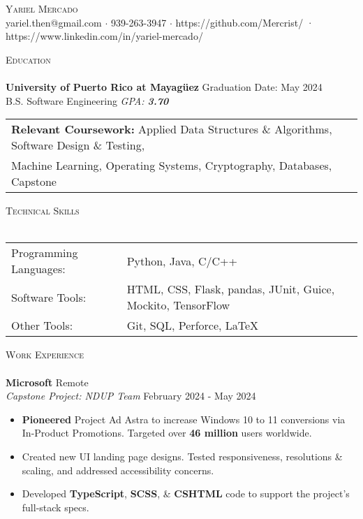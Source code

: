 \documentclass[a4paper]{article}
\newcommand{\lineunder} {
    \vspace*{-8pt} \\
    \hspace*{-18pt} \hrulefill \\
}
\newcommand{\header} [1] {
    {\hspace*{-18pt}\vspace*{6pt} \textsc{#1}}
    \vspace*{-6pt} \lineunder
}
\begin{document}
\vspace*{-40pt}

    

\vspace*{-10pt}
\begin{center}
	{\Huge \scshape {Yariel Mercado}}\\
	yariel.then@gmail.com $\cdot$ 939-263-3947 $\cdot$ https://github.com/Mercrist/ · https://www.linkedin.com/in/yariel-mercado/\\
\end{center}

\header{Education}
\textbf{University of Puerto Rico at Mayagüez} \hfill Graduation Date: May 2024\\	
B.S. Software Engineering \textit{GPA: \bf{3.70}} 

\vspace{2mm}
\begin{tabular}{ l l }
	\textbf{Relevant Coursework:} Applied Data Structures \& Algorithms, Software Design \& Testing, \\Machine Learning, Operating Systems, Cryptography, Databases, Capstone 
\vspace{2mm}
\end{tabular}

\header{Technical Skills}
\begin{tabular}{ l l }
	Programming Languages: & Python, Java, C/C++    \\
	Software Tools: & HTML, CSS, Flask, pandas, JUnit, Guice, Mockito, TensorFlow \\
	Other Tools:   & Git, SQL, Perforce, \LaTeX{} \\
	
\end{tabular}
\vspace{2mm}

\header{Work Experience}
\vspace{-1mm}
\textbf{Microsoft} \hfill Remote\\
\textit{Capstone Project: NDUP Team} \hfill February 2024 - May 2024\\
\vspace{-3mm}
\begin{itemize} \itemsep -1pt
	\item \textbf{Pioneered} Project Ad Astra to increase Windows 10 to 11 conversions via In-Product Promotions. Targeted over \textbf{46 million} users worldwide. 
	\item Created new UI landing page designs. Tested responsiveness, resolutions \& scaling, and addressed accessibility concerns. 
	\item Developed \textbf{TypeScript}, \textbf{SCSS}, \& \textbf{CSHTML} code to support the project's full-stack specs.
\end{itemize} 
\vspace{-2mm}
\end{document}
